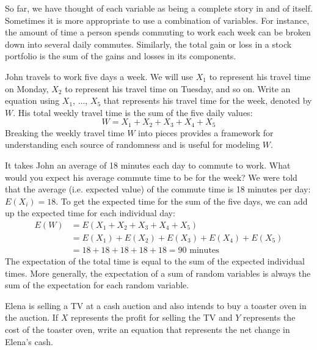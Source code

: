 So far, we have thought of each variable as being a complete story in and of itself. Sometimes it is more appropriate to use a combination of variables. For instance, the amount of time a person spends commuting to work each week can be broken down into several daily commutes. Similarly, the total gain or loss in a stock portfolio is the sum of the gains and losses in its components.

\begin{examplewrap}
\begin{nexample}{John travels to work five days a week. We will use $X_1$ to represent his travel time on Monday, $X_2$ to represent his travel time on Tuesday, and so on. Write an equation using $X_1$, ..., $X_5$ that represents his travel time for the week, denoted by $W$.}
His total weekly travel time is the sum of the five daily values:
$$ W = X_1 + X_2 + X_3 + X_4 + X_5 $$
Breaking the weekly travel time $W$ into pieces provides a framework for understanding each source of randomness and is useful for modeling $W$.
\end{nexample}
\end{examplewrap}

\begin{examplewrap}
\begin{nexample}{It takes John an average of 18 minutes each day to commute to work. What would you expect his average commute time to be for the week?}
We were told that the average (i.e. expected value) of the commute time is 18 minutes per day: $E(X_i) = 18$. To get the expected time for the sum of the five days, we can add up the expected time for each individual day:
\begin{align*}
E(W) &= E(X_1 + X_2 + X_3 + X_4 + X_5) \\
	&= E(X_1) + E(X_2) + E(X_3) + E(X_4) + E(X_5) \\
	&= 18 + 18 + 18 + 18 + 18 = 90\text{ minutes}
\end{align*}
The expectation of the total time is equal to the sum of the expected individual times. More generally, the expectation of a sum of random variables is always the sum of the expectation for each random variable.
\end{nexample}
\end{examplewrap}

\begin{exercisewrap}
\begin{nexercise}
\label{elenaIsSellingATVAndBuyingAToasterOvenAtAnAuction}%
Elena is selling a TV at a cash auction and also intends to buy a toaster oven in the auction. If $X$ represents the profit for selling the TV and $Y$ represents the cost of the toaster oven, write an equation that represents the net change in Elena's cash.\footnotemark
\end{nexercise}
\end{exercisewrap}

